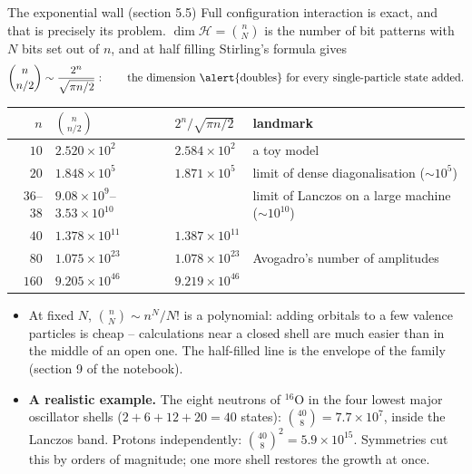 \documentclass[aspectratio=169,10pt]{beamer}
\begin{document}
\begin{frame}{The exponential wall (section 5.5)}
  \footnotesize
  Full configuration interaction is exact, and that is precisely its problem. $\dim\mathcal{H}=\binom{n}{N}$ is the number of bit patterns with $N$ bits set out of $n$, and at half filling Stirling's formula gives
  \[
    \binom{n}{n/2}\sim\frac{2^n}{\sqrt{\pi n/2}}:
    \qquad\text{the dimension \alert{doubles} for every single-particle state added.}
  \]
  \begin{center}\footnotesize
  \renewcommand{\arraystretch}{1.05}
  \begin{tabular}{rll@{\qquad}l}
    \toprule
    $n$ & $\binom{n}{n/2}$ & $2^n/\sqrt{\pi n/2}$ & landmark\\
    \midrule
    $10$ & $2.520\times10^{2}$ & $2.584\times10^{2}$ & a toy model\\
    $20$ & $1.848\times10^{5}$ & $1.871\times10^{5}$ & limit of dense diagonalisation ($\sim10^5$)\\
    $36$--$38$ & $9.08\times10^{9}$--$3.53\times10^{10}$ & & limit of Lanczos on a large machine ($\sim10^{10}$)\\
    $40$ & $1.378\times10^{11}$ & $1.387\times10^{11}$ & \\
    $80$ & $1.075\times10^{23}$ & $1.078\times10^{23}$ & Avogadro's number of amplitudes\\
    $160$ & $9.205\times10^{46}$ & $9.219\times10^{46}$ & \\
    \bottomrule
  \end{tabular}
  \end{center}
  \vspace{-0.6em}
  \begin{itemize}
    \item At fixed $N$, $\binom{n}{N}\sim n^N/N!$ is a polynomial: adding orbitals to a few valence particles is cheap -- calculations near a closed shell are much easier than in the middle of an open one. The half-filled line is the envelope of the family (section 9 of the notebook).
    \item \textbf{A realistic example.} The eight neutrons of $^{16}$O in the four lowest major oscillator shells ($2+6+12+20=40$ states): $\binom{40}{8}=7.7\times10^{7}$, inside the Lanczos band. Protons independently: $\binom{40}{8}^2=5.9\times10^{15}$. Symmetries cut this by orders of magnitude; one more shell restores the growth at once.
  \end{itemize}
\end{frame}
\end{document}
